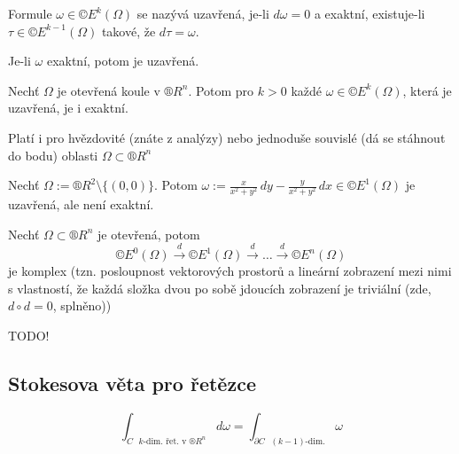 \documentclass[12pt]{article}					%
\begin{document}
        \begin{definice}
            Formule $\omega \in ©E^k(\Omega)$ se nazývá uzavřená, je-li $d\omega = 0$ a exaktní, existuje-li $\tau \in ©E^{k-1}(\Omega)$ takové, že $d\tau = \omega$.
        \end{definice}

        \begin{poznamka}[Platí]
            Je-li $\omega$ exaktní, potom je uzavřená.
        \end{poznamka}

        \begin{lemma}
            Nechť $\Omega$ je otevřená koule v $®R^n$. Potom pro $k>0$ každé $\omega \in ©E^k(\Omega)$, která je uzavřená, je i exaktní.
            
            \begin{poznamkain}
                    Platí i pro hvězdovité (znáte z analýzy) nebo jednoduše souvislé (dá se stáhnout do bodu) oblasti $\Omega \subset ®R^n$
            \end{poznamkain}
        \end{lemma}

        \begin{poznamka}
            Nechť $\Omega := ®R^2 \setminus \{(0, 0)\}$. Potom $\omega := \frac{x}{x^2 + y^2}\,dy - \frac{y}{x^2 + y^2}\,dx \in ©E^1(\Omega)$ je uzavřená, ale není exaktní.
        \end{poznamka}

        \begin{definice}
            Nechť $\Omega \subset ®R^n$ je otevřená, potom
            $$ ©E^0(\Omega) \overset{d}{\rightarrow} ©E^1(\Omega) \overset{d}{\rightarrow} … \overset{d}{\rightarrow} ©E^n(\Omega) $$
            je komplex (tzn. posloupnost vektorových prostorů a lineární zobrazení mezi nimi s vlastností, že každá složka dvou po sobě jdoucích zobrazení je triviální (zde, $d\circ d = 0$, splněno))
        \end{definice}

        TODO!

    
    \subsection{Stokesova věta pro řetězce}
        \begin{poznamka}[Cíl]
            $$ \int_{C\text{ $k$-dim. řet. v $®R^n$}} d\omega = \int_{\partial C\text{ $(k-1)$-dim.}} \omega $$ 
        \end{poznamka}
\end{document}

